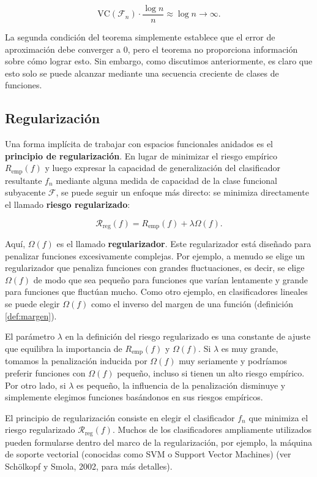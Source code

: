 \documentclass{article}
\begin{document}
\[
\text{VC}(\mathcal{F}_n) \cdot \frac{\log n}{n} \approx \log n \to \infty.
\]

La segunda condición del teorema simplemente establece que el error de aproximación debe converger a \(0\), pero 
el teorema no proporciona información sobre cómo lograr esto. Sin embargo, como discutimos anteriormente, es claro 
que esto solo se puede alcanzar mediante una secuencia creciente de clases de funciones.\newline

\subsection{Regularización}

Una forma implícita de trabajar con espacios funcionales anidados es el \textbf{principio de regularización}. 
En lugar de minimizar el riesgo empírico \(R_{\text{emp}}(f)\) y luego expresar la capacidad de generalización 
del clasificador resultante \(f_n\) mediante alguna medida de capacidad de la clase funcional subyacente 
\(\mathcal{F}\), se puede seguir un enfoque más directo: se minimiza directamente el llamado \textbf{riesgo 
regularizado}:

\[
\mathcal{R}_{\text{reg}}(f) = R_{\text{emp}}(f) + \lambda \Omega(f).
\]

Aquí, \(\Omega(f)\) es el llamado \textbf{regularizador}. Este regularizador está diseñado para penalizar 
funciones excesivamente complejas. Por ejemplo, a menudo se elige un regularizador que penaliza funciones con 
grandes fluctuaciones, es decir, se elige \(\Omega(f)\) de modo que sea pequeño para funciones que varían 
lentamente y grande para funciones que fluctúan mucho. Como otro ejemplo, en clasificadores lineales se puede 
elegir \(\Omega(f)\) como el inverso del margen de una función (definición \ref{def:margen}).\newline

El parámetro \(\lambda\) en la definición del riesgo regularizado es una constante de ajuste que equilibra la 
importancia de \(R_{\text{emp}}(f)\) y \(\Omega(f)\). Si \(\lambda\) es muy grande, tomamos la penalización 
inducida por \(\Omega(f)\) muy seriamente y podríamos preferir funciones con \(\Omega(f)\) pequeño, incluso si 
tienen un alto riesgo empírico. Por otro lado, si \(\lambda\) es pequeño, la influencia de la penalización 
disminuye y simplemente elegimos funciones basándonos en sus riesgos empíricos.\newline

El principio de regularización consiste en elegir el clasificador \(f_n\) que minimiza el riesgo regularizado 
\(\mathcal{R}_{\text{reg}}(f)\). Muchos de los clasificadores ampliamente utilizados pueden formularse dentro 
del marco de la regularización, por ejemplo, la máquina de soporte vectorial (conocidas como SVM o Support Vector Machines)
(ver Schölkopf y Smola, 2002, 
para más detalles).\newline
\end{document}
